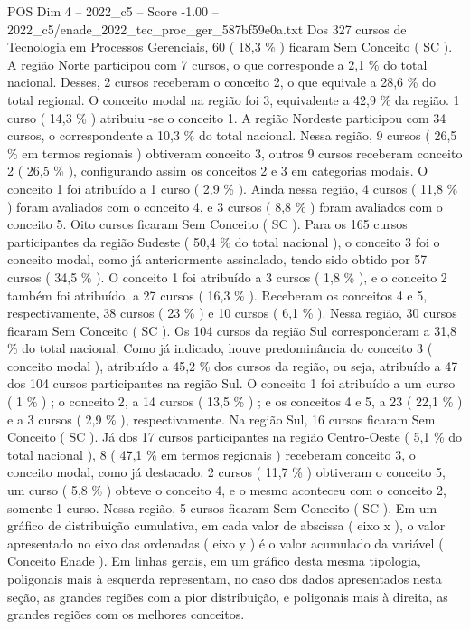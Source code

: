 \begin{textsample}{POS Dim 4 – 2022\_c5 – Score -1.00 – 2022\_c5/enade\_2022\_tec\_proc\_ger\_587bf59e0a.txt}
Dos 327 cursos de Tecnologia em Processos Gerenciais, 60 ( 18,3 \% ) ficaram Sem Conceito ( SC ).
A região Norte participou com 7 cursos, o que corresponde a 2,1 \% do total nacional.
Desses, 2 cursos receberam o conceito 2, o que equivale a 28,6 \% do total regional.
O conceito modal na região foi 3, equivalente a 42,9 \% da região. 1 curso ( 14,3 \% ) atribuiu -se o conceito 1.
A região Nordeste participou com 34 cursos, o correspondente a 10,3 \% do total nacional.
Nessa região, 9 cursos ( 26,5 \% em termos regionais ) obtiveram conceito 3, outros 9 cursos receberam conceito 2 ( 26,5 \% ), configurando assim os conceitos 2 e 3 em categorias modais.
O conceito 1 foi atribuído a 1 curso ( 2,9 \% ).
Ainda nessa região, 4 cursos ( 11,8 \% ) foram avaliados com o conceito 4, e 3 cursos ( 8,8 \% ) foram avaliados com o conceito 5.
Oito cursos ficaram Sem Conceito ( SC ).
Para os 165 cursos participantes da região Sudeste ( 50,4 \% do total nacional ), o conceito 3 foi o conceito modal, como já anteriormente assinalado, tendo sido obtido por 57 cursos ( 34,5 \% ).
O conceito 1 foi atribuído a 3 cursos ( 1,8 \% ), e o conceito 2 também foi atribuído, a 27 cursos ( 16,3 \% ).
Receberam os conceitos 4 e 5, respectivamente, 38 cursos ( 23 \% ) e 10 cursos ( 6,1 \% ).
Nessa região, 30 cursos ficaram Sem Conceito ( SC ).
Os 104 cursos da região Sul corresponderam a 31,8 \% do total nacional.
Como já indicado, houve predominância do conceito 3 ( conceito modal ), atribuído a 45,2 \% dos cursos da região, ou seja, atribuído a 47 dos 104 cursos participantes na região Sul.
O conceito 1 foi atribuído a um curso ( 1 \% ) ; o conceito 2, a 14 cursos ( 13,5 \% ) ; e os conceitos 4 e 5, a 23 ( 22,1 \% ) e a 3 cursos ( 2,9 \% ), respectivamente.
Na região Sul, 16 cursos ficaram Sem Conceito ( SC ).
Já dos 17 cursos participantes na região Centro-Oeste ( 5,1 \% do total nacional ), 8 ( 47,1 \% em termos regionais ) receberam conceito 3, o conceito modal, como já destacado. 2 cursos ( 11,7 \% ) obtiveram o conceito 5, um curso ( 5,8 \% ) obteve o conceito 4, e o mesmo aconteceu com o conceito 2, somente 1 curso.
Nessa região, 5 cursos ficaram Sem Conceito ( SC ).
Em um gráfico de distribuição cumulativa, em cada valor de abscissa ( eixo x ), o valor apresentado no eixo das ordenadas ( eixo y ) é o valor acumulado da variável ( Conceito Enade ).
Em linhas gerais, em um gráfico desta mesma tipologia, poligonais mais à esquerda representam, no caso dos dados apresentados nesta seção, as grandes regiões com a pior distribuição, e poligonais mais à direita, as grandes regiões com os melhores conceitos.

\end{textsample}
